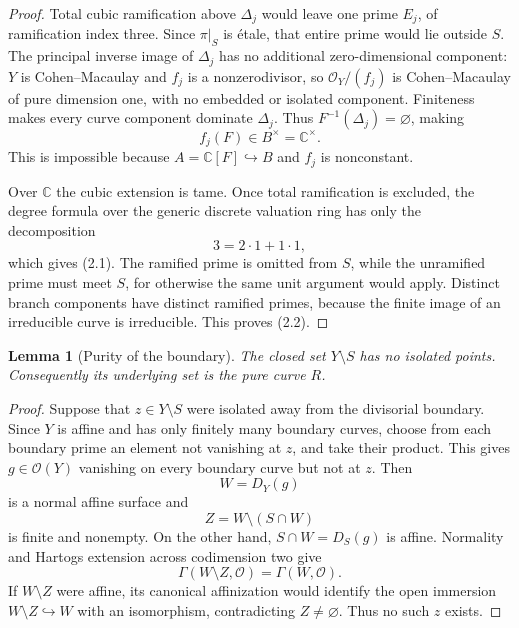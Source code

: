\documentclass[11pt]{article}
\newtheorem{lemma}[theorem]{Lemma}
\theoremstyle{definition}
\theoremstyle{remark}
\newcommand{\C}{\mathbb C}
\begin{document}
\begin{proof}
Total cubic ramification above \(\Delta_j\) would leave one prime
\(E_j\), of ramification index three.  Since \(\pi|_S\) is \'etale,
that entire prime would lie outside \(S\).  The principal inverse image
of \(\Delta_j\) has no additional zero-dimensional component:
\(Y\) is Cohen--Macaulay and \(f_j\) is a nonzerodivisor, so
\(\mathcal O_Y/(f_j)\) is Cohen--Macaulay of pure dimension one, with
no embedded or isolated component.  Finiteness makes every curve
component dominate \(\Delta_j\).  Thus
\(F^{-1}(\Delta_j)=\varnothing\), making
\[
 f_j(F)\in B^\times=\C^\times.
\]
This is impossible because \(A=\C[F]\hookrightarrow B\) and \(f_j\)
is nonconstant.

Over \(\C\) the cubic extension is tame.  Once total ramification is
excluded, the degree formula over the generic discrete valuation ring
has only the decomposition
\[
 3=2\cdot1+1\cdot1,
\]
which gives (2.1).  The ramified prime is omitted from \(S\), while the
unramified prime must meet \(S\), for otherwise the same unit argument
would apply.  Distinct branch components have distinct ramified primes,
because the finite image of an irreducible curve is irreducible.  This
proves (2.2).
\end{proof}

\begin{lemma}[Purity of the boundary]\label{lem:boundary-pure}
The closed set \(Y\setminus S\) has no isolated points.  Consequently
its underlying set is the pure curve \(R\).
\end{lemma}

\begin{proof}
Suppose that \(z\in Y\setminus S\) were isolated away from the
divisorial boundary.  Since \(Y\) is affine and has only finitely many
boundary curves, choose from each boundary prime an element not
vanishing at \(z\), and take their product.  This gives
\(g\in\mathcal O(Y)\) vanishing on every boundary curve but not at
\(z\).  Then
\[
 W=D_Y(g)
\]
is a normal affine surface and
\[
 Z=W\setminus(S\cap W)
\]
is finite and nonempty.  On the other hand,
\(S\cap W=D_S(g)\) is affine.  Normality and Hartogs extension across
codimension two give
\[
 \Gamma(W\setminus Z,\mathcal O)=\Gamma(W,\mathcal O).
\]
If \(W\setminus Z\) were affine, its canonical affinization would
identify the open immersion \(W\setminus Z\hookrightarrow W\) with an
isomorphism, contradicting \(Z\ne\varnothing\).  Thus no such \(z\)
exists.
\end{proof}
\end{document}
